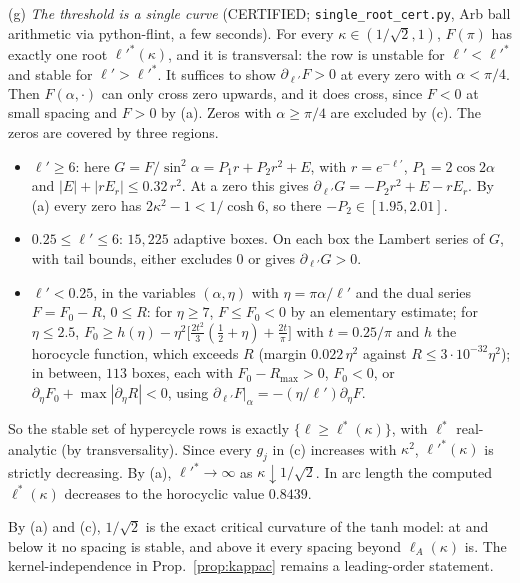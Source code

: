 \documentclass[11pt]{article}
\theoremstyle{remark}
\begin{document}
(g) \emph{The threshold is a single curve} (CERTIFIED; \texttt{single\_root\_cert.py}, Arb ball arithmetic via python-flint,
a few seconds). For every $\kappa\in(1/\sqrt2,1)$, $F(\pi)$ has exactly one root $\ell'^*(\kappa)$, and it is transversal: the
row is unstable for $\ell'<\ell'^*$ and stable for $\ell'>\ell'^*$. It suffices to show $\partial_{\ell'}F>0$ at every zero with
$\alpha<\pi/4$. Then $F(\alpha,\cdot)$ can only cross zero upwards, and it does cross, since $F<0$ at small spacing and $F>0$ by (a).
Zeros with $\alpha\ge\pi/4$ are excluded by (c). The zeros are covered by three regions.
\begin{itemize}
\item $\ell'\ge6$: here $G=F/\sin^2\alpha=P_1r+P_2r^2+E$, with $r=e^{-\ell'}$, $P_1=2\cos2\alpha$ and $|E|+|rE_r|\le0.32\,r^2$. At a
zero this gives $\partial_{\ell'}G=-P_2r^2+E-rE_r$. By (a) every zero has $2\kappa^2-1<1/\cosh6$, so there $-P_2\in[1.95,2.01]$.
\item $0.25\le\ell'\le6$: $15{,}225$ adaptive boxes. On each box the Lambert series of $G$, with tail bounds, either excludes
$0$ or gives $\partial_{\ell'}G>0$.
\item $\ell'<0.25$, in the variables $(\alpha,\eta)$ with $\eta=\pi\alpha/\ell'$ and the dual series $F=F_0-R$, $0\le R$:
for $\eta\ge7$, $F\le F_0<0$ by an elementary estimate; for $\eta\le2.5$, $F_0\ge h(\eta)-\eta^2\big[\tfrac{2t^2}3(\tfrac12+\eta)+\tfrac{2t}\pi\big]$
with $t=0.25/\pi$ and $h$ the horocycle function, which exceeds $R$ (margin $0.022\,\eta^2$ against $R\le3\cdot10^{-32}\eta^2$);
in between, $113$ boxes, each with $F_0-R_{\max}>0$, $F_0<0$, or $\partial_\eta F_0+\max|\partial_\eta R|<0$, using
$\partial_{\ell'}F|_\alpha=-(\eta/\ell')\partial_\eta F$.
\end{itemize}
So the stable set of hypercycle rows is exactly $\{\ell\ge\ell^*(\kappa)\}$, with $\ell^*$ real-analytic (by transversality).
Since every $g_j$ in (c) increases with $\kappa^2$, $\ell'^*(\kappa)$ is strictly decreasing. By (a), $\ell'^*\to\infty$ as
$\kappa\downarrow1/\sqrt2$. In arc length the computed $\ell^*(\kappa)$ decreases to the horocyclic value $0.8439$.

By (a) and (c), $1/\sqrt2$ is the exact critical curvature of the tanh model: at and below it no spacing is stable, and above
it every spacing beyond $\ell_A(\kappa)$ is. The kernel-independence in Prop.~\ref{prop:kappac} remains a leading-order
statement.
\end{document}
